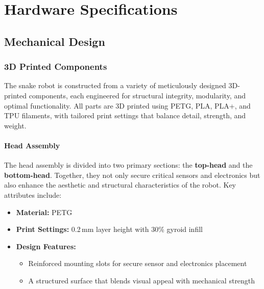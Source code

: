 \documentclass[12pt,a4paper]{report}
\begin{document}
\appendix
\chapter{Hardware Specifications}
\section{Mechanical Design}
\subsection{3D Printed Components}

The snake robot is constructed from a variety of meticulously designed 3D-printed components, each engineered for structural integrity, modularity, and optimal functionality. All parts are 3D printed using PETG, PLA, PLA+, and TPU filaments, with tailored print settings that balance detail, strength, and weight.

\FloatBarrier
\subsubsection{Head Assembly}
The head assembly is divided into two primary sections: the \textbf{top-head} and the \textbf{bottom-head}. Together, they not only secure critical sensors and electronics but also enhance the aesthetic and structural characteristics of the robot. Key attributes include:
\begin{itemize}
    \item \textbf{Material:} PETG
    \item \textbf{Print Settings:} 0.2\,mm layer height with 30\% gyroid infill
    \item \textbf{Design Features:}
    \begin{itemize}
        \item Reinforced mounting slots for secure sensor and electronics placement
        \item A structured surface that blends visual appeal with mechanical strength
    \end{itemize}
\end{itemize}
\end{document}

